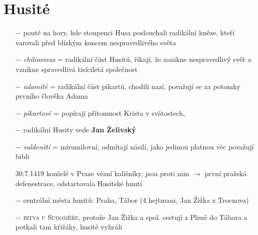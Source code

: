 \documentclass{article}
\begin{document}
\section*{Husité}
\begin{itemize}
    \vspace{-0.5em}
    \setlength\itemsep{0.15em}
    \item[$-$] poutě na hory, kde stoupenci Husa poslouchali radikální kněze, kteří varovali před blízkým koncem nespravedlivého světa
    \item[$-$] \textit{chiliasmus} = radikální část Husitů, říkají, že zanikne nespravedlivý svět a vznikne spravedlivá tisíciletá společnost
    \item[$-$] \textit{adamité} = radikální část pikartů, chodili nazí, považují se za potomky prvního člověka Adama
    \item[$-$] \textit{pikartové} = popírají přítomnost Krista v svátostech,  
    \item[$-$] radikální Husity vede \textbf{Jan Želivský}
    \item[$-$] \textit{valdenští} = mírumilovní, odmítají násilí, jako jedinou platnou věc považují bibli
    \item[30.7.1419] konšelé v Praze vězní kališníky, jsou proti nim $\rightarrow$ první pražská defenestrace, odstartovala Husitské hnutí
    \item[$-$] centrální města husitů: Praha, Tábor (4 hejtmani, Jan Žižka z Trocnova)
    \item[$-$] \textsc{bitva u Sudoměře}, protože Jan Žižka a spol. cestují z Plzně do Tábora a potkali tam křižáky, husité vyhráli
\end{itemize}
\end{document}
